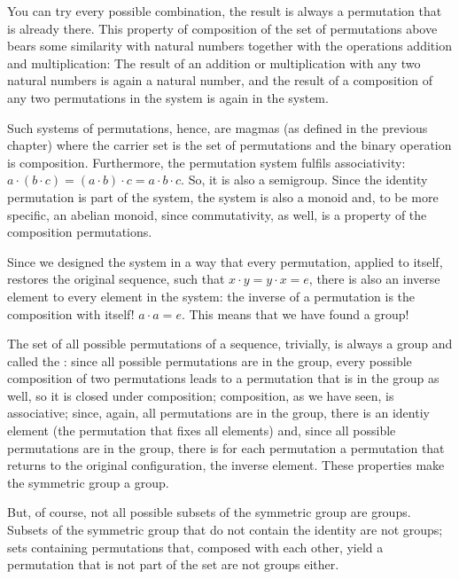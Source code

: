 \documentclass{scrreprt}
\begin{document}
You can try every possible combination,
the result is always a permutation
that is already there.
This property of composition
of the set of permutations above bears some similarity 
with natural numbers together with
the operations addition and multiplication:
The result of an addition or multiplication
with any two natural numbers 
is again a natural number,
and the result of a composition
of any two permutations in the system
is again in the system.

Such systems of permutations, hence, are magmas
(as defined in the previous chapter) 
where the carrier set is the set of permutations
and the binary operation is composition.
Furthermore, the permutation system 
fulfils associativity:
$a \cdot (b \cdot c) = (a \cdot b) \cdot c = a \cdot b \cdot c$.
So, it is also a semigroup.
Since the identity permutation
is part of the system,
the system is also a monoid and, to be more specific,
an abelian monoid, since commutativity, as well,
is a property of the composition permutations.

Since we designed the system in a way
that every permutation, applied to itself,
restores the original sequence,
such that $x \cdot y = y \cdot x = e$,
there is also an inverse element 
to every element in the system:
the inverse of a permutation is the composition with itself!
$a \cdot a = e$.
This means that we have found a group!

The set of all possible permutations of a sequence, trivially,
is always a group and called the :
since all possible permutations are in the group,
every possible composition of two permutations
leads to a permutation that is in the group as well,
so it is closed under composition;
composition, as we have seen, is associative;
since, again, all permutations are in the group,
there is an identiy element (the permutation that fixes all elements) and,
since all possible permutations are in the group,
 there is for each permutation 
 a permutation that returns to the original configuration,
the inverse element.
These properties make the symmetric group a group.

But, of course, not all possible subsets of the 
symmetric group are groups. 
Subsets of the symmetric group
that do not contain the identity
are not groups;
sets containing permutations that,
composed with each other,
yield a permutation that is not part of the set
are not groups either.
\end{document}
